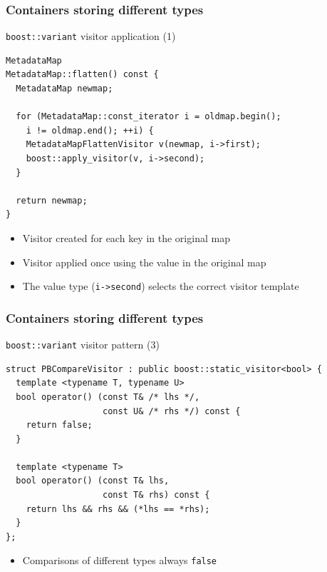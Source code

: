 \documentclass[handout]{beamer}
\begin{document}
\begin{frame}[fragile]
  \frametitle{Containers storing different types}
  \begin{block}{\texttt{boost::variant} visitor application (1)}
    \scriptsize
    \begin{lstlisting}
MetadataMap
MetadataMap::flatten() const {
  MetadataMap newmap;

  for (MetadataMap::const_iterator i = oldmap.begin();
    i != oldmap.end(); ++i) {
    MetadataMapFlattenVisitor v(newmap, i->first);
    boost::apply_visitor(v, i->second);
  }

  return newmap;
}
\end{lstlisting}
  \begin{itemize}
    \pause
  \item Visitor created for each key in the original map
  \item Visitor applied once using the value in the original map
  \item The value type (\texttt{i->second}) selects the correct visitor template
  \end{itemize}
  \end{block}
\end{frame}

\begin{frame}[fragile]
  \frametitle{Containers storing different types}
  \begin{block}{\texttt{boost::variant} visitor pattern (3)}
    \scriptsize
    \begin{lstlisting}
struct PBCompareVisitor : public boost::static_visitor<bool> {
  template <typename T, typename U>
  bool operator() (const T& /* lhs */,
                   const U& /* rhs */) const {
    return false;
  }

  template <typename T>
  bool operator() (const T& lhs,
                   const T& rhs) const {
    return lhs && rhs && (*lhs == *rhs);
  }
};
\end{lstlisting}
  \begin{itemize}
    \pause
  \item Comparisons of different types always \texttt{false}
  \end{itemize}
  \end{block}
\end{frame}
\end{document}
